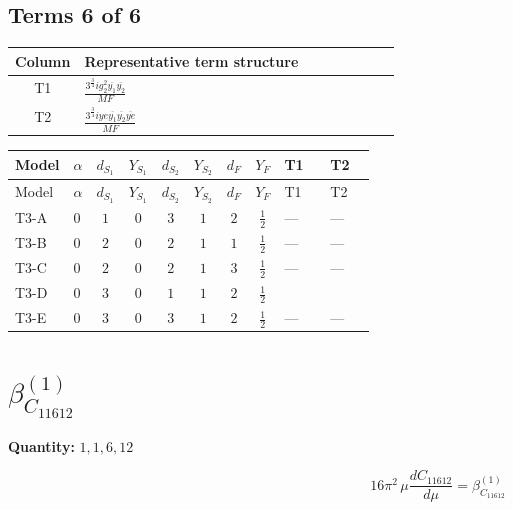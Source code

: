 \documentclass[8pt]{article}
\begin{document}
\begin{landscape}
\subsection*{Terms 6 of 6}
\begin{center}
\begin{tabular}{@{}c >{\raggedright\arraybackslash}p{0.82\linewidth}@{}}
\toprule
Column & Representative term structure \\
\midrule
T1 & \(\displaystyle \frac{3^{\frac{3}{4}} i g_{2}^{2} \overline{y_{1}} \overline{y_{2}}}{MF}\) \\
\midrule
T2 & \(\displaystyle \frac{3^{\frac{3}{4}} i ye \overline{y_{1}} \overline{y_{2}} \overline{ye}}{MF}\) \\
\midrule
\bottomrule
\end{tabular}
\end{center}
\smallskip
\tiny
\begin{longtable}{@{}llcccccc >{\raggedright\arraybackslash}p{0.21\linewidth} >{\raggedright\arraybackslash}p{0.21\linewidth}@{}}
\toprule
Model & $\alpha$ & $d_{S_1}$ & $Y_{S_1}$ & $d_{S_2}$ & $Y_{S_2}$ & $d_F$ & $Y_F$ & T1 & T2 \\
\midrule
\endfirsthead
\toprule
Model & $\alpha$ & $d_{S_1}$ & $Y_{S_1}$ & $d_{S_2}$ & $Y_{S_2}$ & $d_F$ & $Y_F$ & T1 & T2 \\
\midrule
\endhead
T3-A & $0$ & $1$ & $0$ & $3$ & $1$ & $2$ & $\frac{1}{2}$ & --- & --- \\
\midrule
T3-B & $0$ & $2$ & $0$ & $2$ & $1$ & $1$ & $\frac{1}{2}$ & --- & --- \\
\midrule
T3-C & $0$ & $2$ & $0$ & $2$ & $1$ & $3$ & $\frac{1}{2}$ & --- & --- \\
\midrule
T3-D & $0$ & $3$ & $0$ & $1$ & $1$ & $2$ & $\frac{1}{2}$ & \scriptsize\adjustbox{max width=\linewidth}{$\begin{gathered} \frac{17 \cdot 3^{\frac{3}{4}} i g_{2}^{2} \overline{y_{1}} \overline{y_{2}}}{24 MF}\end{gathered}$} & \scriptsize\adjustbox{max width=\linewidth}{$\begin{gathered} - \frac{3^{\frac{3}{4}} i ye \overline{y_{1}} \overline{y_{2}} \overline{ye}}{12 MF}\end{gathered}$} \\
\midrule
T3-E & $0$ & $3$ & $0$ & $3$ & $1$ & $2$ & $\frac{1}{2}$ & --- & --- \\
\midrule
\bottomrule
\end{longtable}
\clearpage
\section*{$\beta_{C_{11612}}^{(1)}$}
\noindent\textbf{Quantity: }$\mathrm{1,1,6,12}$\par\smallskip
\[16\pi^2\,\mu\frac{d C_{11612}}{d\mu}=\beta_{C_{11612}}^{(1)}\]

\end{landscape}
\end{document}
